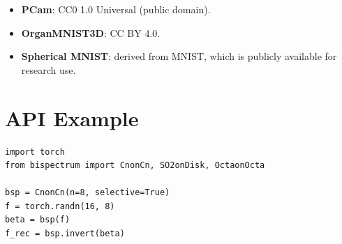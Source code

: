 \documentclass{article}
\theoremstyle{definition}
\theoremstyle{remark}
\theoremstyle{definition}
\begin{document}
\begin{itemize}[nosep]
  \item \textbf{PCam}: CC0 1.0 Universal (public domain).
  \item \textbf{OrganMNIST3D}: CC BY 4.0.
  \item \textbf{Spherical MNIST}: derived from MNIST, which is
    publicly available for research use.
\end{itemize}

\section{API Example}
\label{app:api-example}

\begin{lstlisting}
import torch
from bispectrum import CnonCn, SO2onDisk, OctaonOcta

bsp = CnonCn(n=8, selective=True)
f = torch.randn(16, 8)
beta = bsp(f)
f_rec = bsp.invert(beta)
\end{lstlisting}

\newpage

\end{document}

